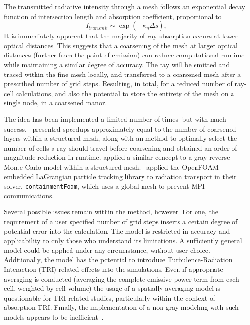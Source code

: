 The transmitted radiative intensity through a mesh follows an exponential decay function of intersection length and absorption coefficient, proportional to
\begin{equation}
     I_{transmit} \sim \exp{\left(-\kappa{}_\eta{}\Delta{s}\right)},
    \label{eq:specular_reflection}
\end{equation}
It is immediately apparent that the majority of ray absorption occurs at lower optical distances. This suggests that a coarsening of the mesh at larger optical distances (further from the point of emission) can reduce computational runtime while maintaining a similar degree of accuracy.
The ray will be emitted and traced within the fine mesh locally, and transferred to a coarsened mesh after a prescribed number of grid steps.
Resulting, in total, for a reduced number of ray-cell calculations, and also the potential to store the entirety of the mesh on a single node, in a coarsened manor. 

The idea has been implemented a limited number of times, but with much success.~\citet{Silvestri2019ASimulation} presented speedups approximately equal to the number of coarsened layers within a structured mesh, along with an method to optimally select the number of cells a ray should travel before coarsening and obtained an order of magnitude reduction in runtime. 
\citet{Humphrey2015ATracing} applied a similar concept to a gray reverse Monte Carlo model within a structured mesh.~\citet{Kelm2021TheTransport} applied the OpenFOAM-embedded LaGrangian particle tracking library to radiation transport in their solver, \verb|containmentFoam|, which uses a global mesh to prevent MPI communications.

Several possible issues remain within the method, however. For one, the requirement of a user specified number of grid steps inserts a certain degree of potential error into the calculation. 
The model is restricted in accuracy and applicability to only those who understand its limitations. A sufficiently general model could be applied under any circumstance, without user choice.
Additionally, the model has the potential to introduce Turbulence-Radiation Interaction (TRI)-related effects into the simulations. 
Even if appropriate averaging is conducted (averaging the complete emissive power term from each cell, weighted by cell volume) the usage of a spatially-averaging model is questionable for TRI-related studies, particularly within the context of absorption-TRI.
Finally, the implementation of a non-gray modeling with such models appears to be inefficient~\cite{Humphrey2012RadiationSystem}.

